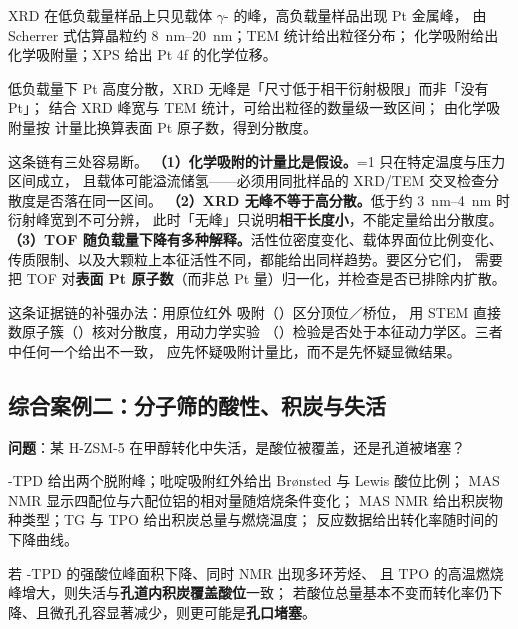 \begin{obs}
XRD 在低负载量样品上只见载体 $\gamma$- 的峰，高负载量样品出现 Pt 金属峰，
由 Scherrer 式估算晶粒约 \qtyrange{8}{20}{nm}；TEM 统计给出粒径分布；
 化学吸附给出化学吸附量；XPS 给出 Pt 4f 的化学位移。
\end{obs}

\begin{infer}
低负载量下 Pt 高度分散，XRD 无峰是「尺寸低于相干衍射极限」而非「没有 Pt」；
结合 XRD 峰宽与 TEM 统计，可给出粒径的数量级一致区间；
由化学吸附量按  计量比换算表面 Pt 原子数，得到分散度。
\end{infer}

\begin{pitfall}
这条链有三处容易断。
\textbf{（1）化学吸附的计量比是假设。}=1 只在特定温度与压力区间成立，
且载体可能溢流储氢——必须用同批样品的 XRD/TEM 交叉检查分散度是否落在同一区间。
\textbf{（2）XRD 无峰不等于高分散。}低于约 \qtyrange{3}{4}{nm} 时衍射峰宽到不可分辨，
此时「无峰」只说明\textbf{相干长度小}，不能定量给出分散度。
\textbf{（3）TOF 随负载量下降有多种解释。}活性位密度变化、载体界面位比例变化、
传质限制、以及大颗粒上本征活性不同，都能给出同样趋势。要区分它们，
需要把 TOF 对\textbf{表面 Pt 原子数}（而非总 Pt 量）归一化，并检查是否已排除内扩散。
\end{pitfall}

\begin{crosscheck}
这条证据链的补强办法：用原位红外  吸附（）区分顶位／桥位，
用 STEM 直接数原子簇（）核对分散度，用动力学实验
（）检验是否处于本征动力学区。三者中任何一个给出不一致，
应先怀疑吸附计量比，而不是先怀疑显微结果。
\end{crosscheck}

\subsection{综合案例二：分子筛的酸性、积炭与失活}

\textbf{问题}：某 H-ZSM-5 在甲醇转化中失活，是酸位被覆盖，还是孔道被堵塞？

\begin{obs}
-TPD 给出两个脱附峰；吡啶吸附红外给出 Br\o nsted 与 Lewis 酸位比例；
 MAS NMR 显示四配位与六配位铝的相对量随焙烧条件变化；
 MAS NMR 给出积炭物种类型；TG 与 TPO 给出积炭总量与燃烧温度；
反应数据给出转化率随时间的下降曲线。
\end{obs}

\begin{infer}
若 -TPD 的强酸位峰面积下降、同时  NMR 出现多环芳烃、
且 TPO 的高温燃烧峰增大，则失活与\textbf{孔道内积炭覆盖酸位}一致；
若酸位总量基本不变而转化率仍下降、且微孔孔容显著减少，则更可能是\textbf{孔口堵塞}。
\end{infer}

